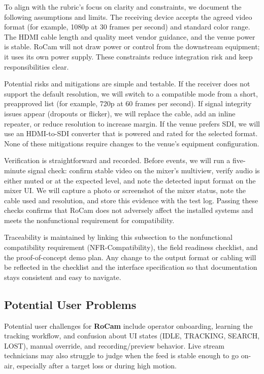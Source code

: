 \documentclass[12pt]{article}
\begin{document}
To align with the rubric’s focus on clarity and constraints, we document the following assumptions and limits. The receiving device accepts the agreed video format (for example, 1080p at 30 frames per second) and standard color range. The HDMI cable length and quality meet vendor guidance, and the venue power is stable. RoCam will not draw power or control from the downstream equipment; it uses its own power supply. These constraints reduce integration risk and keep responsibilities clear.

Potential risks and mitigations are simple and testable. If the receiver does not support the default resolution, we will switch to a compatible mode from a short, preapproved list (for example, 720p at 60 frames per second). If signal integrity issues appear (dropouts or flicker), we will replace the cable, add an inline repeater, or reduce resolution to increase margin. If the venue prefers SDI, we will use an HDMI-to-SDI converter that is powered and rated for the selected format. None of these mitigations require changes to the venue’s equipment configuration.

Verification is straightforward and recorded. Before events, we will run a five-minute signal check: confirm stable video on the mixer’s multiview, verify audio is either muted or at the expected level, and note the detected input format on the mixer UI. We will capture a photo or screenshot of the mixer status, note the cable used and resolution, and store this evidence with the test log. Passing these checks confirms that RoCam does not adversely affect the installed systems and meets the nonfunctional requirement for compatibility.

Traceability is maintained by linking this subsection to the nonfunctional compatibility requirement (NFR-Compatibility), the field readiness checklist, and the proof-of-concept demo plan. Any change to the output format or cabling will be reflected in the checklist and the interface specification so that documentation stays consistent and easy to navigate.





\subsection{Potential User Problems}

Potential user challenges for \textbf{RoCam} include operator onboarding, learning the tracking workflow, and confusion about UI states (IDLE, TRACKING, SEARCH, LOST), manual override, and recording/preview behavior. Live stream technicians may also struggle to judge when the feed is stable enough to go on-air, especially after a target loss or during high motion.
\end{document}

